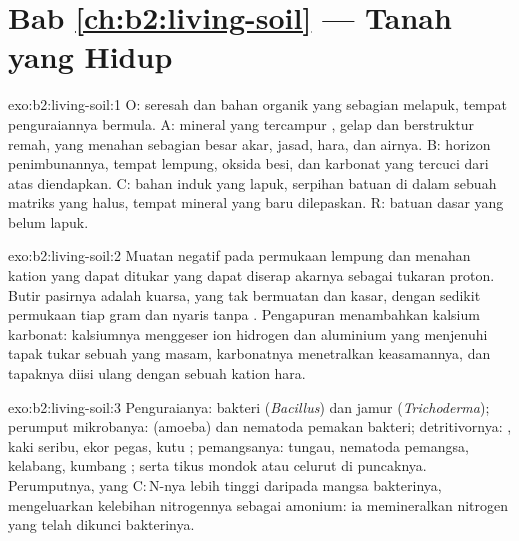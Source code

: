 \section*{Bab \ref{ch:b2:living-soil} --- Tanah yang Hidup}

\begin{solution}{exo:b2:living-soil:1}
O: seresah dan bahan organik yang sebagian melapuk, tempat
penguraiannya bermula. A:  mineral yang tercampur , gelap dan
berstruktur remah, yang menahan sebagian besar akar, jasad, hara, dan
airnya. B: horizon penimbunannya, tempat lempung, oksida besi, dan
karbonat yang tercuci dari atas diendapkan. C: bahan induk yang lapuk,
serpihan batuan di dalam sebuah matriks yang halus, tempat 
mineral yang baru dilepaskan. R: batuan dasar yang belum lapuk.
\end{solution}

\begin{solution}{exo:b2:living-soil:2}
Muatan negatif pada permukaan lempung dan  menahan kation yang
dapat ditukar yang dapat diserap akarnya sebagai tukaran proton. Butir
pasirnya adalah kuarsa, yang tak bermuatan dan kasar, dengan sedikit
permukaan tiap gram dan nyaris tanpa . Pengapuran menambahkan
kalsium karbonat: kalsiumnya menggeser ion hidrogen dan aluminium yang
menjenuhi tapak tukar sebuah  yang masam, karbonatnya menetralkan
keasamannya, dan tapaknya diisi ulang dengan sebuah kation hara.
\end{solution}

\begin{solution}{exo:b2:living-soil:3}
Penguraianya: bakteri (\emph{Bacillus}) dan jamur
(\emph{Trichoderma}); perumput mikrobanya:  (amoeba) dan
nematoda pemakan bakteri; detritivornya: , kaki seribu,
ekor pegas, kutu ; pemangsanya: tungau, nematoda pemangsa,
kelabang, kumbang ; serta tikus mondok atau celurut di puncaknya.
Perumputnya, yang $\mathrm{C:N}$-nya lebih tinggi daripada mangsa
bakterinya, mengeluarkan kelebihan nitrogennya sebagai amonium: ia
memineralkan nitrogen yang telah dikunci bakterinya.
\end{solution}

